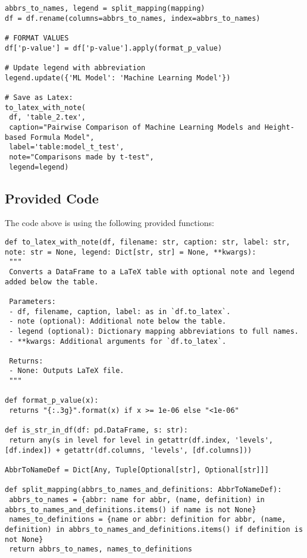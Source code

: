 \documentclass[11pt]{article}
\begin{document}
\begin{verbatim}
abbrs_to_names, legend = split_mapping(mapping)
df = df.rename(columns=abbrs_to_names, index=abbrs_to_names)

# FORMAT VALUES 
df['p-value'] = df['p-value'].apply(format_p_value)

# Update legend with abbreviation
legend.update({'ML Model': 'Machine Learning Model'})

# Save as Latex:
to_latex_with_note(
 df, 'table_2.tex',
 caption="Pairwise Comparison of Machine Learning Models and Height-based Formula Model", 
 label='table:model_t_test',
 note="Comparisons made by t-test",
 legend=legend)

\end{verbatim}

\subsection{Provided Code}
The code above is using the following provided functions:

\begin{verbatim}
def to_latex_with_note(df, filename: str, caption: str, label: str, note: str = None, legend: Dict[str, str] = None, **kwargs):
 """
 Converts a DataFrame to a LaTeX table with optional note and legend added below the table.

 Parameters:
 - df, filename, caption, label: as in `df.to_latex`.
 - note (optional): Additional note below the table.
 - legend (optional): Dictionary mapping abbreviations to full names.
 - **kwargs: Additional arguments for `df.to_latex`.

 Returns:
 - None: Outputs LaTeX file.
 """

def format_p_value(x):
 returns "{:.3g}".format(x) if x >= 1e-06 else "<1e-06"

def is_str_in_df(df: pd.DataFrame, s: str):
 return any(s in level for level in getattr(df.index, 'levels', [df.index]) + getattr(df.columns, 'levels', [df.columns]))

AbbrToNameDef = Dict[Any, Tuple[Optional[str], Optional[str]]]

def split_mapping(abbrs_to_names_and_definitions: AbbrToNameDef):
 abbrs_to_names = {abbr: name for abbr, (name, definition) in abbrs_to_names_and_definitions.items() if name is not None}
 names_to_definitions = {name or abbr: definition for abbr, (name, definition) in abbrs_to_names_and_definitions.items() if definition is not None}
 return abbrs_to_names, names_to_definitions

\end{verbatim}
\end{document}
